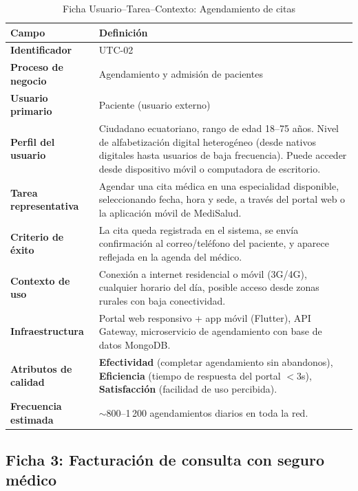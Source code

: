 \documentclass[12pt,a4paper]{article}
\begin{document}
\begin{table}[H]
\centering
\caption{Ficha Usuario--Tarea--Contexto: Agendamiento de citas}
\begin{tabularx}{\textwidth}{l X}
\toprule
\textbf{Campo} & \textbf{Definici\'on} \\
\midrule
\textbf{Identificador} & UTC-02 \\
\textbf{Proceso de negocio} & Agendamiento y admisi\'on de pacientes \\
\textbf{Usuario primario} & Paciente (usuario externo) \\
\textbf{Perfil del usuario} & Ciudadano ecuatoriano, rango de edad 18--75 a\~nos. Nivel de alfabetizaci\'on digital heterog\'eneo (desde nativos digitales hasta usuarios de baja frecuencia). Puede acceder desde dispositivo m\'ovil o computadora de escritorio. \\
\textbf{Tarea representativa} & Agendar una cita m\'edica en una especialidad disponible, seleccionando fecha, hora y sede, a trav\'es del portal web o la aplicaci\'on m\'ovil de MediSalud. \\
\textbf{Criterio de \'exito} & La cita queda registrada en el sistema, se env\'ia confirmaci\'on al correo/tel\'efono del paciente, y aparece reflejada en la agenda del m\'edico. \\
\textbf{Contexto de uso} & Conexi\'on a internet residencial o m\'ovil (3G/4G), cualquier horario del d\'ia, posible acceso desde zonas rurales con baja conectividad. \\
\textbf{Infraestructura} & Portal web responsivo + app m\'ovil (Flutter), API Gateway, microservicio de agendamiento con base de datos MongoDB. \\
\textbf{Atributos de calidad} & \textbf{Efectividad} (completar agendamiento sin abandonos), \textbf{Eficiencia} (tiempo de respuesta del portal $<3$s), \textbf{Satisfacci\'on} (facilidad de uso percibida). \\
\textbf{Frecuencia estimada} & $\sim$800--1\,200 agendamientos diarios en toda la red. \\
\bottomrule
\end{tabularx}
\end{table}

\subsection{Ficha 3: Facturaci\'on de consulta con seguro m\'edico}
\end{document}
